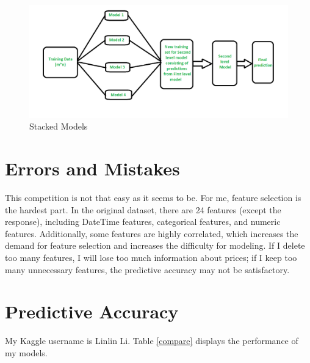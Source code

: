 \documentclass[11pt]{article}
\begin{document}
\begin{figure}[h]
  \caption{Stacked Models}
  \label{stacked}
  \centering
  \includegraphics[width=\textwidth]{../img/stacking.png}
\end{figure}

\section{Errors and Mistakes}

This competition is not that easy as it seems to be. For me, feature selection is the hardest part. In the original dataset, there are 24 features (except the response), including DateTime features, categorical features, and numeric features. Additionally, some features are highly correlated, which increases the demand for feature selection and increases the difficulty for modeling. If I delete too many features, I will lose too much information about prices; if I keep too many unnecessary features, the predictive accuracy may not be satisfactory.

\section{Predictive Accuracy}

My Kaggle username is Linlin Li. Table \ref{compare} displays the performance of my models. 
\end{document}
